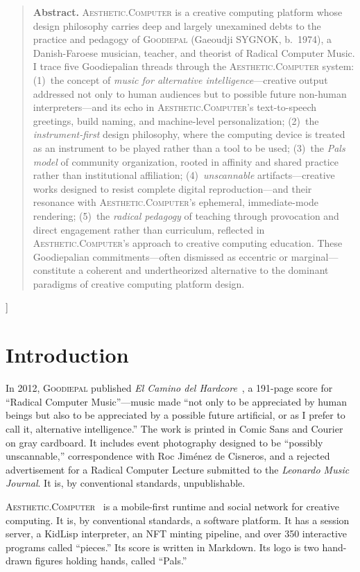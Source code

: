 \documentclass[10pt,letterpaper,twocolumn]{article}
\newcommand{\ac}{\textsc{Aesthetic.Computer}}
\newcommand{\gp}{\textsc{Goodiepal}}
\begin{document}
{\begin{quote}
\small\noindent\textbf{Abstract.}
\ac{} is a creative computing platform whose design philosophy carries deep and largely unexamined debts to the practice and pedagogy of \gp{} (Gaeoudji SYGNOK, b.~1974), a Danish-Faroese musician, teacher, and theorist of Radical Computer Music. I trace five Goodiepalian threads through the \ac{} system: (1)~the concept of \emph{music for alternative intelligence}---creative output addressed not only to human audiences but to possible future non-human interpreters---and its echo in \ac{}'s text-to-speech greetings, build naming, and machine-level personalization; (2)~the \emph{instrument-first} design philosophy, where the computing device is treated as an instrument to be played rather than a tool to be used; (3)~the \emph{Pals model} of community organization, rooted in affinity and shared practice rather than institutional affiliation; (4)~\emph{unscannable} artifacts---creative works designed to resist complete digital reproduction---and their resonance with \ac{}'s ephemeral, immediate-mode rendering; (5)~the \emph{radical pedagogy} of teaching through provocation and direct engagement rather than curriculum, reflected in \ac{}'s approach to creative computing education. These Goodiepalian commitments---often dismissed as eccentric or marginal---constitute a coherent and undertheorized alternative to the dominant paradigms of creative computing platform design.
\end{quote}
\vspace{0.5em}
}]

\section{Introduction}

In 2012, \gp{} published \emph{El Camino del Hardcore}~\citep{goodiepal2012elcamino}, a 191-page score for ``Radical Computer Music''---music made ``not only to be appreciated by human beings but also to be appreciated by a possible future artificial, or as I prefer to call it, alternative intelligence.'' The work is printed in Comic Sans and Courier on gray cardboard. It includes event photography designed to be ``possibly unscannable,'' correspondence with Roc Jim\'enez de Cisneros, and a rejected advertisement for a Radical Computer Lecture submitted to the \emph{Leonardo Music Journal}. It is, by conventional standards, unpublishable.

\ac{}~\citep{scudder2026ac} is a mobile-first runtime and social network for creative computing. It is, by conventional standards, a software platform. It has a session server, a KidLisp interpreter, an NFT minting pipeline, and over 350 interactive programs called ``pieces.'' Its score is written in Markdown. Its logo is two hand-drawn figures holding hands, called ``Pals.''
\end{document}
